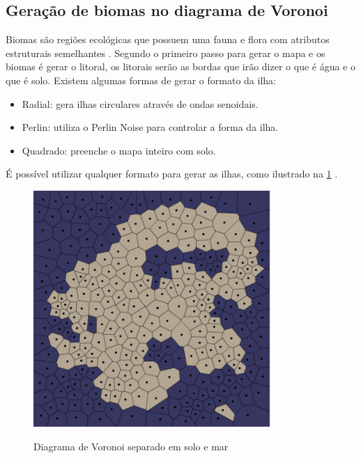 \subsection{Geração de biomas no diagrama de Voronoi}
\label{sec:geracaoProcedural}

Biomas são regiões ecológicas que possuem uma fauna e flora com atributos estruturais semelhantes \space\cite{maestrovirtuale}. Segundo \space{} o primeiro passo para gerar o mapa e os biomas é gerar o litoral, os litorais serão as bordas que irão dizer o que é água e o que é solo. Existem algumas formas de gerar o formato da ilha:

\begin{itemize}
    \item Radial: gera ilhas circulares através de ondas senoidais.
    \item Perlin: utiliza o Perlin Noise para controlar a forma da ilha.
    \item Quadrado: preenche o mapa inteiro com solo.
\end{itemize}

É possível utilizar qualquer formato para gerar as ilhas, como ilustrado na \cref{fig:voronoi-land-water} \space\cite{amitp2010}.

\begin{figure}[ht]
	\caption{Diagrama de Voronoi separado em solo e mar}
	\centering %
	\includegraphics[width=0.8\textwidth]{figures/voronoi-land-water.png} %
	\label{fig:voronoi-land-water}
\end{figure}

